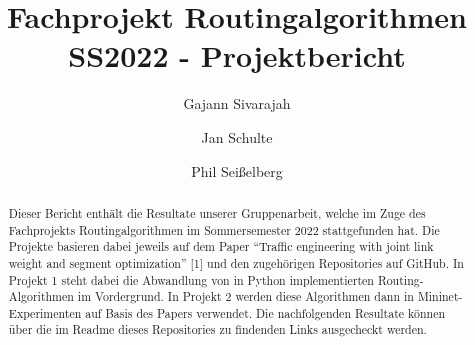 \documentclass[sigconf,noacm,review]{acmart}
\begin{document}
\title{Fachprojekt Routingalgorithmen SS2022 - Projektbericht}


\author{Gajann Sivarajah}
\author{Jan Schulte}
\author{Phil Seißelberg}


\begin{abstract}
  Dieser Bericht enthält die Resultate unserer Gruppenarbeit, welche im Zuge des 
  Fachprojekts Routingalgorithmen im Sommersemester 2022 stattgefunden hat. 
  Die Projekte basieren dabei jeweils auf dem Paper ``Traffic engineering with joint link
  weight and segment optimization'' [1] und den zugehörigen Repositories auf GitHub.
  In Projekt 1 steht dabei die Abwandlung von in Python implementierten Routing-Algorithmen
  im Vordergrund. In Projekt 2 werden diese Algorithmen dann in Mininet-Experimenten auf Basis
  des Papers verwendet. Die nachfolgenden Resultate können über die im Readme dieses Repositories zu findenden Links
  ausgecheckt werden. 
  \end{abstract}

\maketitle
\end{document}
